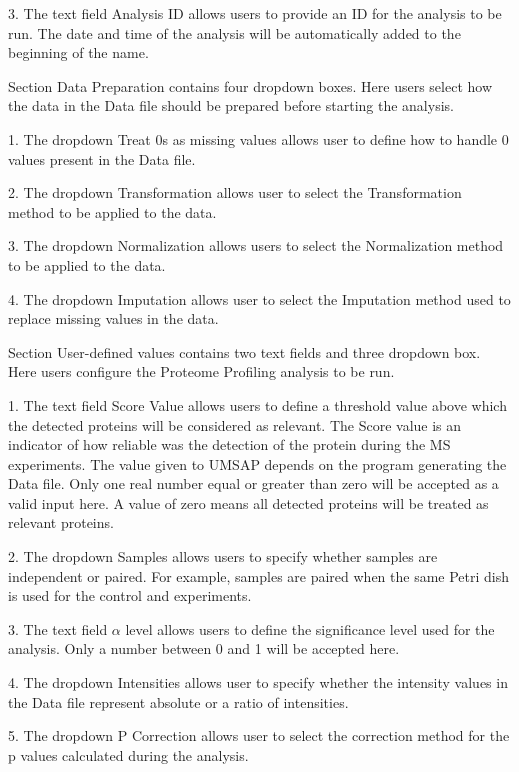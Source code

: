 \num{3}. The text field Analysis ID allows users to provide an ID for the analysis
to be run. The date and time of the analysis will be automatically added to the
beginning of the name.

Section Data Preparation contains four dropdown boxes. Here users select how the data
in the Data file should be prepared before starting the analysis.

\num{1}. The dropdown Treat \num{0}s as missing values allows user to define how
to handle \num{0} values present in the Data file.

\num{2}. The dropdown Transformation allows user to select the Transformation method
to be applied to the data.

\num{3}. The dropdown Normalization allows users to select the Normalization method
to be applied to the data.

\num{4}. The dropdown Imputation allows user to select the Imputation method used
to replace missing values in the data.

Section User-defined values contains two text fields and three dropdown box. Here
users configure the Proteome Profiling analysis to be run.

\num{1}. The text field Score Value\label{par:protprofScoreValue} allows users to
define a threshold value above which the detected proteins will be considered as
relevant. The Score value is an indicator of how reliable was the detection of
the protein during the MS experiments. The value given to UMSAP depends on the program
generating the Data file. Only one real number equal or greater than zero will be
accepted as a valid input here. A value of zero means all detected proteins will be
treated as relevant proteins.

\num{2}. The dropdown Samples allows users to specify whether samples are independent
or paired. For example, samples are paired when the same Petri dish is used for the
control and experiments.

\num{3}. The text field $\alpha$ level allows users to define the significance level
used for the analysis. Only a number between \num{0} and \num{1} will be accepted
here.

\num{4}. The dropdown Intensities allows user to specify whether the intensity values
in the Data file represent absolute or a ratio of intensities.

\num{5}. The dropdown P Correction allows user to select the correction method for
the p values calculated during the analysis.

